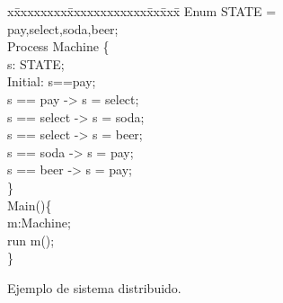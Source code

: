 \begin{figure}[t]
\begin{minipage}[t]{.47\textwidth}
\fontsize{6.6}{6.6}\selectfont\ttfamily
\begin{tabbing}
x\=xxxxxxxx\=xxxxxxxxxxxx\=xx\=xxx\= \kill
Enum STATE = {pay,select,soda,beer}; \\[1ex]

Process Machine \{\\[1ex]
\>s: STATE; \\
\>Initial: s==pay;\\[1ex]

\>[insertCoin] s == pay -> s = select; \\
\>[choose] s == select -> s = soda; \\
\>[choose] s == select -> s = beer; \\
\>[getSoda] s == soda -> s = pay; \\
\>[getBeer] s == beer -> s = pay; \\
\} \\[1ex]

Main()\{\\[1ex]
\>m:Machine; \\
\>run m(); \\
\}\\
\end{tabbing}
\end{minipage}
\hfill
\vspace{-0.5cm}
\caption{Ejemplo de sistema distribuido.} \label{fig:exam_language2}
\vspace{-0.5cm}
\end{figure}
\fi



